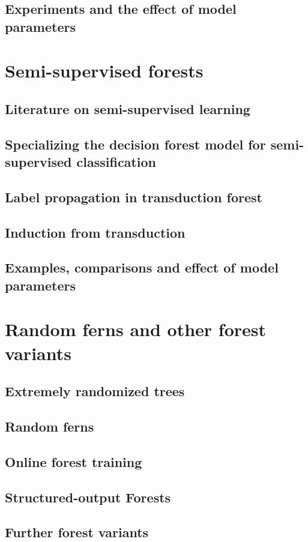\documentclass[11pt,aspectratio=1610,usenames,dvipsnames]{beamer} %
\begin{document}
\subsection{Experiments and the effect of model parameters}%
\section{Semi-supervised forests}%
\subsection{Literature on semi-supervised learning}%
\subsection{Specializing the decision forest model for semi-supervised classification}%
\subsection{Label propagation in transduction forest}%
\subsection{Induction from transduction}%
\subsection{Examples, comparisons and effect of model parameters}%
\section{Random ferns and other forest variants}%
\subsection{Extremely randomized trees}%
\subsection{Random ferns}%
\subsection{Online forest training}%

\subsection{Structured-output Forests}%

\subsection{Further forest variants}%
\end{document}
